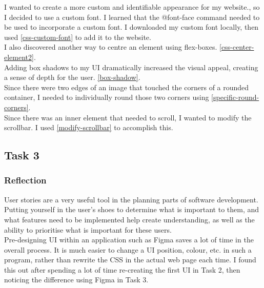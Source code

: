 \documentclass[portfolio.tex.tex]{subfiles}
\begin{document}
					I wanted to create a more custom and identifiable appearance for my website., so I decided to use a custom font. I learned that the @font-face command needed to be used to incorporate a custom font. I downloaded my custom font locally, then used \ref{css-custom-font} to add it to the website.\\

					I also discovered another way to centre an element using flex-boxes.  \ref{css-center-element2}.\\

					Adding box shadows to my UI dramatically increased the visual appeal, creating a sense of depth for the user. \ref{box-shadow}.\\

					Since there were two edges of an image that touched the corners of a rounded container, I needed to individually round those two corners using \ref{specific-round-corners}.\\

					Since there was an inner element that needed to scroll, I wanted to modify the scrollbar. I used \ref{modify-scrollbar} to accomplish this.\\

			\subsection{Task 3}
				\subsubsection{Reflection}
					User stories are a very useful tool in the planning parts of software development. Putting yourself in the user's shoes to determine what is important to them, and what features need to be implemented help create understanding, as well as the ability to prioritise what is important for these users.\\

					Pre-designing UI within an application such as Figma saves a lot of time in the overall process. It is much easier to change a UI position, colour, etc.  in such a program, rather than rewrite the CSS in the actual web page each time. I found this out after spending a lot of time re-creating the first UI in Task 2, then noticing the difference using Figma in Task 3.\\
\end{document}
